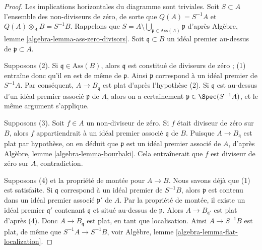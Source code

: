 \begin{proof}
Les implications horizontales du diagramme sont triviales.
Soit $S \subset A$ l'ensemble des non-diviseurs de zéro, de sorte que
$Q(A) = S^{-1}A$ et $Q(A) \otimes_A B = S^{-1}B$. Rappelons que
$S = A \setminus \bigcup_{\mathfrak p \in \text{Ass}(A)} \mathfrak p$
d'après Algèbre, lemme \ref{algebra-lemma-ass-zero-divisors}.
Soit $\mathfrak q \subset B$ un idéal premier au-dessus de $\mathfrak p \subset A$.

\medskip\noindent
Supposons (2). Si $\mathfrak q \in \text{Ass}(B)$, alors
$\mathfrak q$ est constitué de diviseurs de zéro ; (1) entraîne donc
qu'il en est de même de $\mathfrak p$. Ainsi
$\mathfrak p$ correspond à un idéal premier de $S^{-1}A$.
Par conséquent, $A \to B_\mathfrak q$ est plat d'après l'hypothèse (2).
Si $\mathfrak q$ est au-dessus d'un idéal premier associé $\mathfrak p$
de $A$, alors on a certainement $\mathfrak p \in \Spec(S^{-1}A)$, et le
même argument s'applique.

\medskip\noindent
Supposons (3). Soit $f \in A$ un non-diviseur de zéro. Si $f$ était diviseur de zéro
sur $B$, alors $f$ appartiendrait à un idéal premier associé $\mathfrak q$
de $B$. Puisque $A \to B_\mathfrak q$ est plat par hypothèse, on en déduit que
$\mathfrak p$ est un idéal premier associé de $A$, d'après
Algèbre, lemme \ref{algebra-lemma-bourbaki}. Cela entraînerait que
$f$ est diviseur de zéro sur $A$, contradiction.

\medskip\noindent
Supposons (4) et la propriété de montée pour $A \to B$. Nous savons déjà que (1) est satisfaite.
Si $\mathfrak q$ correspond à un idéal premier de $S^{-1}B$, alors $\mathfrak p$
est contenu dans un idéal premier associé $\mathfrak p'$ de $A$. Par la propriété de montée,
il existe un idéal premier $\mathfrak q'$ contenant $\mathfrak q$ et situé
au-dessus de $\mathfrak p$. Alors $A \to B_{\mathfrak q'}$ est plat d'après
(4). Donc $A \to B_{\mathfrak q}$ est plat, en tant que localisation.
Ainsi $A \to S^{-1}B$ est plat, de même que $S^{-1}A \to S^{-1}B$, voir
Algèbre, lemme \ref{algebra-lemma-flat-localization}.
\end{proof}


